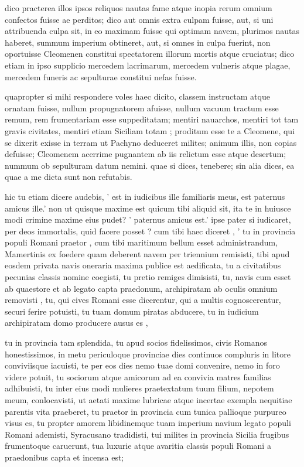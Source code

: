  dico practerea illos ipsos reliquos nautas fame atque inopia rerum omnium confectos fuisse ae perditos; dico aut omnis extra culpam fuisse, aut, si uni attribuenda culpa sit, in eo maximam fuisse qui optimam navem, plurimos nautas haberet, summum imperium obtineret, aut, si omnes in culpa fuerint, non oportuisse Cleomenen constitui spectatorem illorum mortis atque cruciatus; dico etiam in ipso supplicio mercedem lacrimarum, mercedem vulneris atque plagae, mercedem funeris ac sepulturae constitui nefas fuisse.

 quapropter si mihi respondere voles haec dicito, classem instructam atque ornatam fuisse, nullum propugnatorem afuisse, nullum vacuum tractum esse remum, rem frumentariam esse suppeditatam; mentiri nauarchos, mentiri tot tam gravis civitates, mentiri etiam Siciliam totam ; proditum esse te a Cleomene, qui se dixerit exisse in terram ut Pachyno deduceret milites; animum illis, non copias defuisse; Cleomenem acerrime pugnantem ab iis relictum esse atque desertum; nummum ob sepulturam datum nemini. quae si dices, tenebere; sin alia dices, ea quae a me dicta sunt non refutabis.

 hic tu etiam dicere audebis, ' est in iudicibus ille familiaris meus, est paternus amicus ille.' non ut quisque maxime est quicum tibi aliquid sit, ita te in huiusce modi crimine maxime eius pudet? ' paternus amicus est.' ipse pater si iudicaret, per deos immortalis, quid facere posset ? cum tibi haec diceret , ' tu in provincia populi Romani praetor , cum tibi maritimum bellum esset administrandum, Mamertinis ex foedere quam deberent navem per triennium remisisti, tibi apud eosdem privata navis oneraria maxima publice est aedificata, tu a civitatibus pecunias classis nomine coegisti, tu pretio remiges dimisisti, tu, navis cum esset ab quaestore et ab legato capta praedonum, archipiratam ab oculis omnium removisti , tu, qui cives Romani esse dicerentur, qui a multis cognoscerentur, securi ferire potuisti, tu tuam domum piratas abducere, tu in iudicium archipiratam domo producere ausus es ,

 tu in provincia tam splendida, tu apud socios fidelissimos, civis Romanos honestissimos, in metu periculoque provinciae dies continuos compluris in litore conviviisque iacuisti, te per eos dies nemo tuae domi convenire, nemo in foro videre potuit, tu sociorum atque amicorum ad ea convivia matres familias adhibuisti, tu inter eius modi mulieres praetextatum tuum filium, nepotem meum, conlocavisti, ut aetati maxime lubricae atque incertae exempla nequitiae parentis vita praeberet, tu praetor in provincia cum tunica pallioque purpureo visus es, tu propter amorem libidinemque tuam imperium navium legato populi Romani ademisti, Syracusano tradidisti, tui milites in provincia Sicilia frugibus frumentoque caruerunt, tua luxurie atque avaritia classis populi Romani a praedonibus capta et incensa est;

